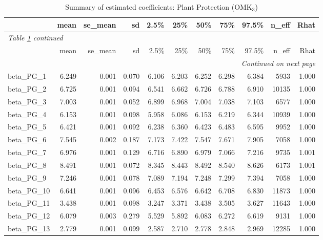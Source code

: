 \documentclass[12pt]{article}
\begin{document}
\begingroup
\footnotesize
\setlength{\tabcolsep}{3pt}
\begin{longtable}{lrrrrrrrrrr}
\caption{Summary of estimated coefficients: Plant Protection (OMK$_\text{3}$)}
\label{tab:coef_summary_omk3} \\
\toprule
 & mean & se\_mean & sd & 2.5\% & 25\% & 50\% & 75\% & 97.5\% & n\_eff & Rhat \\
\midrule
\endfirsthead
\multicolumn{11}{l}{\textit{Table \ref{tab:coef_summary_omk3} continued}} \\
\toprule
 & mean & se\_mean & sd & 2.5\% & 25\% & 50\% & 75\% & 97.5\% & n\_eff & Rhat \\
\midrule
\endhead
\midrule
\multicolumn{11}{r}{\textit{Continued on next page}} \\
\endfoot
\bottomrule
\endlastfoot
beta\_PG\_1  & 6.249 & 0.001 & 0.070 & 6.106 & 6.203 & 6.252 & 6.298 & 6.384 &  5933 & 1.000 \\
beta\_PG\_2  & 6.725 & 0.001 & 0.094 & 6.541 & 6.662 & 6.726 & 6.788 & 6.910 & 10135 & 1.000 \\
beta\_PG\_3  & 7.003 & 0.001 & 0.052 & 6.899 & 6.968 & 7.004 & 7.038 & 7.103 &  6577 & 1.000 \\
beta\_PG\_4  & 6.153 & 0.001 & 0.098 & 5.958 & 6.086 & 6.153 & 6.219 & 6.344 & 10939 & 1.000 \\
beta\_PG\_5  & 6.421 & 0.001 & 0.092 & 6.238 & 6.360 & 6.423 & 6.483 & 6.595 &  9952 & 1.000 \\
beta\_PG\_6  & 7.545 & 0.002 & 0.187 & 7.173 & 7.422 & 7.547 & 7.671 & 7.905 &  7058 & 1.000 \\
beta\_PG\_7  & 6.976 & 0.001 & 0.129 & 6.716 & 6.890 & 6.979 & 7.066 & 7.216 &  9735 & 1.001 \\
beta\_PG\_8  & 8.491 & 0.001 & 0.072 & 8.345 & 8.443 & 8.492 & 8.540 & 8.626 &  6173 & 1.001 \\
beta\_PG\_9  & 7.246 & 0.001 & 0.078 & 7.089 & 7.194 & 7.248 & 7.299 & 7.394 &  7058 & 1.000 \\
beta\_PG\_10 & 6.641 & 0.001 & 0.096 & 6.453 & 6.576 & 6.642 & 6.708 & 6.830 & 11873 & 1.000 \\
beta\_PG\_11 & 3.438 & 0.001 & 0.098 & 3.247 & 3.371 & 3.438 & 3.505 & 3.627 & 11643 & 1.000 \\
beta\_PG\_12 & 6.079 & 0.003 & 0.279 & 5.529 & 5.892 & 6.083 & 6.272 & 6.619 &  9131 & 1.000 \\
beta\_PG\_13 & 2.779 & 0.001 & 0.099 & 2.587 & 2.710 & 2.778 & 2.848 & 2.969 & 12285 & 1.000 \\

\end{longtable}
\end{document}
